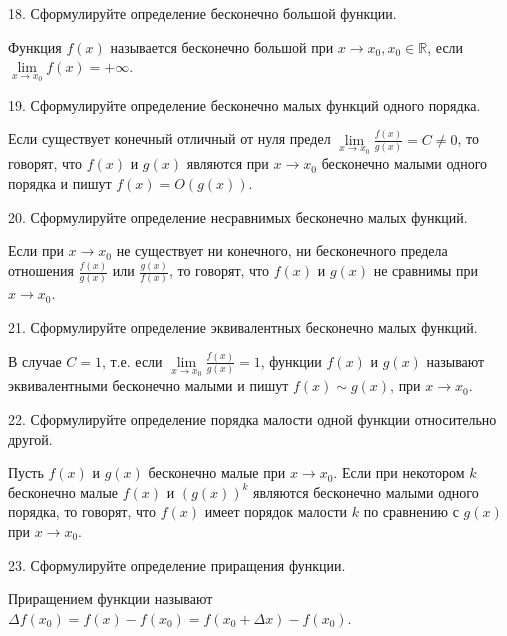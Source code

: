\documentclass[a4paper, 10pt]{article}
\begin{document}
    \begin{bf}18. Сформулируйте определение бесконечно большой функции.\end{bf}
    
    Функция $f(x)$ называется бесконечно большой при $x \to x_0, x_0 \in \mathbb{R}$, 
    если $\lim\limits_{x \to x_0} f(x) = +\infty$.

    \begin{bf}19. Сформулируйте определение бесконечно малых функций одного порядка.\end{bf}

    Если существует конечный отличный от нуля предел $\lim\limits_{x \to x_0}\frac{f(x)}{g(x)} = C \ne 0$,
    то говорят, что $f(x)$ и $g(x)$ являются при $x \to x_0$ бесконечно малыми одного порядка и пишут $f(x) = O(g(x))$.

    \begin{bf}20. Сформулируйте определение несравнимых бесконечно малых функций.\end{bf}

    Если при $x \to x_0$ не существует ни конечного, ни бесконечного предела 
    отношения $\frac{f(x)}{g(x)}$ или $\frac{g(x)}{f(x)}$, то говорят, что $f(x)$ и $g(x)$ не сравнимы при $x \to x_0$.

    \begin{bf}21. Сформулируйте определение эквивалентных бесконечно малых функций.\end{bf}
    
    В случае $C = 1$, т.е. если $\lim\limits_{x \to x_0}\frac{f(x)}{g(x)} = 1$, 
    функции $f(x)$ и $g(x)$ называют эквивалентными бесконечно малыми и пишут $f(x) \sim g(x)$, при $x \to x_0$.

    \begin{bf}22. Сформулируйте определение порядка малости одной функции относительно другой.\end{bf}

    Пусть $f(x)$ и $g(x)$ бесконечно малые при $x \to x_0$. Если при некотором $k$
    бесконечно малые $f(x)$ и $(g(x))^k$ являются бесконечно малыми одного порядка,
    то говорят, что $f(x)$ имеет порядок малости $k$ по сравнению с $g(x)$ при $x \to x_0$.

    \begin{bf}23. Сформулируйте определение приращения функции.\end{bf}

    Приращением функции называют $\Delta f(x_0) = f(x) - f(x_0) = f(x_0 + \Delta x) - f(x_0)$.
\end{document}
